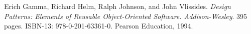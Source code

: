 \documentclass[]{UCD_CS_FYP_Report}
\begin{document}
\newpage
\begin{thebibliography}{99}
 Erich Gamma, Richard Helm, Ralph Johnson, and John Vlissides. \emph{ Design Patterns: Elements of Reusable Object-Oriented Software. Addison-Wesley}. 395 pages. ISBN-13: 978-0-201-63361-0. Pearson Education, 1994.
\end{thebibliography}
\label{endpage}
\end{document}
